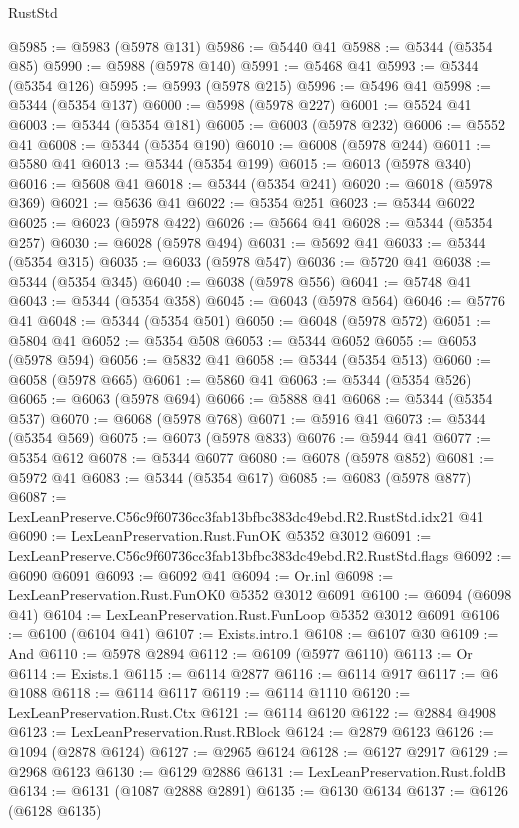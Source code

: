 \begin{lexlean}{RustStd}
\begin{coremodule}
@5985 := @5983 (@5978 @131)
@5986 := @5440 @41
@5988 := @5344 (@5354 @85)
@5990 := @5988 (@5978 @140)
@5991 := @5468 @41
@5993 := @5344 (@5354 @126)
@5995 := @5993 (@5978 @215)
@5996 := @5496 @41
@5998 := @5344 (@5354 @137)
@6000 := @5998 (@5978 @227)
@6001 := @5524 @41
@6003 := @5344 (@5354 @181)
@6005 := @6003 (@5978 @232)
@6006 := @5552 @41
@6008 := @5344 (@5354 @190)
@6010 := @6008 (@5978 @244)
@6011 := @5580 @41
@6013 := @5344 (@5354 @199)
@6015 := @6013 (@5978 @340)
@6016 := @5608 @41
@6018 := @5344 (@5354 @241)
@6020 := @6018 (@5978 @369)
@6021 := @5636 @41
@6022 := @5354 @251
@6023 := @5344 @6022
@6025 := @6023 (@5978 @422)
@6026 := @5664 @41
@6028 := @5344 (@5354 @257)
@6030 := @6028 (@5978 @494)
@6031 := @5692 @41
@6033 := @5344 (@5354 @315)
@6035 := @6033 (@5978 @547)
@6036 := @5720 @41
@6038 := @5344 (@5354 @345)
@6040 := @6038 (@5978 @556)
@6041 := @5748 @41
@6043 := @5344 (@5354 @358)
@6045 := @6043 (@5978 @564)
@6046 := @5776 @41
@6048 := @5344 (@5354 @501)
@6050 := @6048 (@5978 @572)
@6051 := @5804 @41
@6052 := @5354 @508
@6053 := @5344 @6052
@6055 := @6053 (@5978 @594)
@6056 := @5832 @41
@6058 := @5344 (@5354 @513)
@6060 := @6058 (@5978 @665)
@6061 := @5860 @41
@6063 := @5344 (@5354 @526)
@6065 := @6063 (@5978 @694)
@6066 := @5888 @41
@6068 := @5344 (@5354 @537)
@6070 := @6068 (@5978 @768)
@6071 := @5916 @41
@6073 := @5344 (@5354 @569)
@6075 := @6073 (@5978 @833)
@6076 := @5944 @41
@6077 := @5354 @612
@6078 := @5344 @6077
@6080 := @6078 (@5978 @852)
@6081 := @5972 @41
@6083 := @5344 (@5354 @617)
@6085 := @6083 (@5978 @877)
@6087 := LexLeanPreserve.C56c9f60736cc3fab13bfbc383dc49ebd.R2.RustStd.idx21 @41
@6090 := LexLeanPreservation.Rust.FunOK @5352 @3012
@6091 := LexLeanPreserve.C56c9f60736cc3fab13bfbc383dc49ebd.R2.RustStd.flags
@6092 := @6090 @6091
@6093 := @6092 @41
@6094 := Or.inl
@6098 := LexLeanPreservation.Rust.FunOK0 @5352 @3012 @6091
@6100 := @6094 (@6098 @41)
@6104 := LexLeanPreservation.Rust.FunLoop @5352 @3012 @6091
@6106 := @6100 (@6104 @41)
@6107 := Exists.intro.{1}
@6108 := @6107 @30
@6109 := And
@6110 := @5978 @2894
@6112 := @6109 (@5977 @6110)
@6113 := Or
@6114 := Exists.{1}
@6115 := @6114 @2877
@6116 := @6114 @917
@6117 := @6 @1088
@6118 := @6114 @6117
@6119 := @6114 @1110
@6120 := LexLeanPreservation.Rust.Ctx
@6121 := @6114 @6120
@6122 := @2884 @4908
@6123 := LexLeanPreservation.Rust.RBlock
@6124 := @2879 @6123
@6126 := @1094 (@2878 @6124)
@6127 := @2965 @6124
@6128 := @6127 @2917
@6129 := @2968 @6123
@6130 := @6129 @2886
@6131 := LexLeanPreservation.Rust.foldB
@6134 := @6131 (@1087 @2888 @2891)
@6135 := @6130 @6134
@6137 := @6126 (@6128 @6135)

\end{coremodule}
\end{lexlean}
